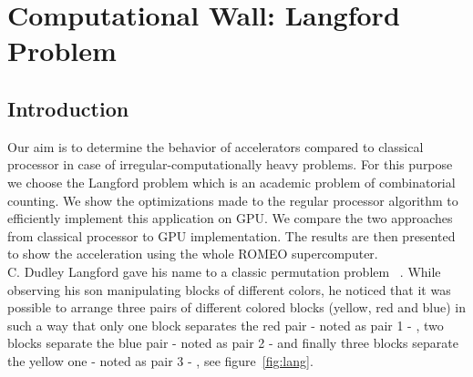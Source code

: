
\chapter{Computational Wall: Langford Problem}

\section{Introduction}
Our aim is to determine the behavior of accelerators compared to classical processor in case of irregular-computationally heavy problems.
For this purpose we choose the Langford problem which is an academic problem of combinatorial counting.
We show the optimizations made to the regular processor algorithm to efficiently implement this application on GPU. 
We compare the two approaches from classical processor to GPU implementation. 
The results are then presented to show the acceleration using the whole ROMEO supercomputer.\\

C. Dudley Langford gave his name to a classic permutation problem ~\cite{Gard56, Simp83}.  
While observing his son manipulating blocks of different colors, he noticed that it was possible to arrange three pairs of different colored blocks (yellow, red and blue) in such a way that only one block separates the red pair - noted as pair 1 - , two blocks separate the blue pair - noted as pair 2 - and finally three blocks separate the yellow one - noted as pair 3 - , see figure~\ref{fig:lang}.\\

